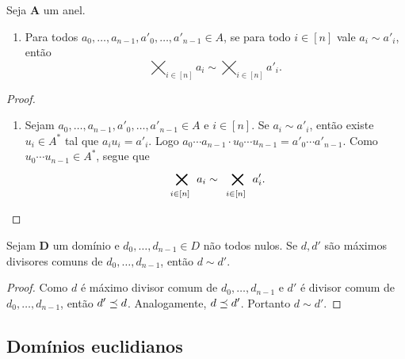 \begin{proposition}
Seja $\bm A$ um anel.
	\begin{enumerate}
	\item Para todos $a_0,\ldots,a_{n-1},a'_0,\ldots,a'_{n-1} \in A$, se para todo $i \in [n]$ vale $a_i \sim a'_i$, então
		\begin{equation*}
		\bigtimes_{i \in [n]} a_i \sim \bigtimes_{i \in [n]} a'_i.
		\end{equation*}
	\end{enumerate}
\end{proposition}
\begin{proof}
	\begin{enumerate}
	\item Sejam $a_0,\ldots,a_{n-1},a'_0,\ldots,a'_{n-1} \in A$ e $i \in [n]$. Se $a_i \sim a'_i$, então existe $u_i \in A^*$ tal que $a_iu_i = a'_i$. Logo $a_0 \cdots a_{n-1} \cdot u_0 \cdots u_{n-1} = a'_0 \cdots a'_{n-1}$. Como $u_0 \cdots u_{n-1} \in A^*$, segue que
		\begin{equation*}
		\bigtimes_{i \in [n]} a_i \sim \bigtimes_{i \in [n]} a'_i. \qedhere
		\end{equation*}
	\end{enumerate}
\end{proof}

\begin{proposition}
Sejam $\bm D$ um domínio e $d_0, \ldots, d_{n-1} \in D$ não todos nulos. Se $d,d'$ são máximos divisores comuns de $d_0,\ldots,d_{n-1}$, então $d \sim d'$.
\end{proposition}
\begin{proof}
Como $d$ é máximo divisor comum de $d_0,\ldots,d_{n-1}$ e $d'$ é divisor comum de $d_0,\ldots,d_{n-1}$, então $d' \preceq d$. Analogamente, $d \preceq d'$.
Portanto $d \sim d'$.
\end{proof}















\subsection{Domínios euclidianos}

